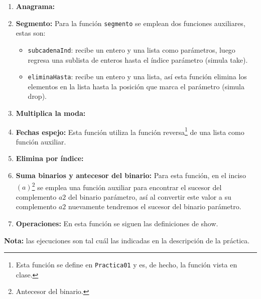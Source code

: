 \documentclass{article}
\newcommand{\code}[1]{\textcolor{white!25!black}{\texttt{#1}}}
\begin{document}
\begin{enumerate}
  
\item \textbf{Anagrama:}
  
\item \textbf{Segmento:} Para la función \code{segmento} se emplean dos funciones
  auxiliares, estas son:
  \begin{itemize}
  \item \code{subcadenaInd}: recibe un entero y una lista como parámetros, luego
    regresa una sublista de enteros hasta el índice parámetro (simula take).
  \item \code{eliminaHasta}: recibe un entero y una lista, así esta función elimina
    los elementos en la lista hasta la posición que marca el parámetro (simula drop).
  \end{itemize}
\item \textbf{Multiplica la moda:}
  
\item \textbf{Fechas espejo:} Esta función utiliza la función reversa\footnote{Esta
función se define en \code{Practica01} y es, de hecho, la función vista en clase.}
  de una lista como función auxiliar.
  
\item \textbf{Elimina por índice:}
  
\item \textbf{Suma binarios y antecesor del binario:} Para esta función, en el
  inciso $(a)$\footnote{Antecesor del binario.} se emplea una función auxiliar
  para encontrar el sucesor del complemento $a2$ del binario parámetro, así al
  convertir este valor a su complemento $a2$ nuevamente tendremos el sucesor
  del binario parámetro.
  
\item \textbf{Operaciones:} En esta función se siguen las definiciones de show.
\end{enumerate}
\textbf{Nota:} las ejecuciones son tal cuál las indicadas en la descripción de la práctica.
\end{document}
